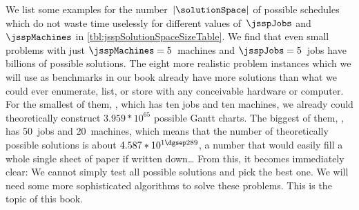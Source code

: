 %
We list some examples for the number~$\left|\solutionSpace\right|$ of possible schedules which do not waste time uselessly for different values of~$\jsspJobs$ and~$\jsspMachines$ in \autoref{tbl:jsspSolutionSpaceSizeTable}.
We find that even small problems with just $\jsspMachines=5$~machines and $\jsspJobs=5$~jobs have billions of possible solutions.
The eight more realistic problem instances which we will use as benchmarks in our book already have more solutions than what we could ever enumerate, list, or store with any conceivable hardware or computer.
For the smallest of them, , which has ten jobs and ten machines, we already could theoretically construct $3.959*10^{65}$ possible Gantt charts.
The biggest of them, , has 50~jobs and 20~machines, which means that the number of theoretically possible solutions is about $4.587*10^{1\dgsep289}$, a number that would easily fill a whole single sheet of paper if written down\dots%
%
%
%
From this, it becomes immediately clear:
We cannot simply test all possible solutions and pick the best one.
We will need some more sophisticated algorithms to solve these problems.
This is the topic of this book.

